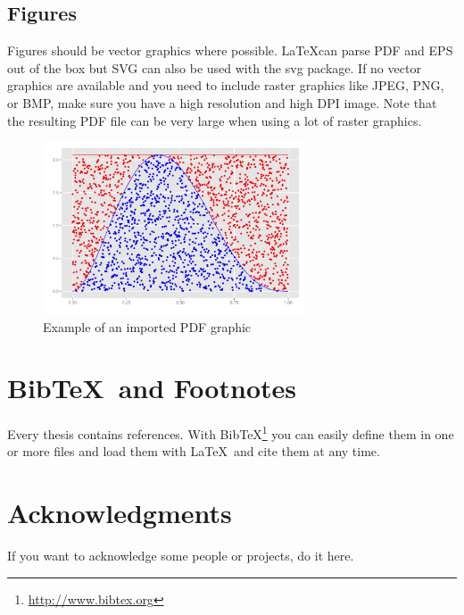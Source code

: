 \documentclass[masterarbeit, grey, english]{mas-thesis-sections}	%
\begin{document}
\subsection{Figures}

Figures should be vector graphics where possible. \LaTeX can parse PDF and EPS out of the box but SVG can also be used with the svg package. If no vector graphics are available and you need to include raster graphics like JPEG, PNG, or BMP, make sure you have a high resolution and high DPI image. Note that the resulting PDF file can be very large when using a lot of raster graphics.

\begin{figure}[ht]
	\centering
	\includegraphics[height=5.1cm]{graphics/demo-graphic.pdf}
	\caption{Example of an imported PDF graphic}
	\label{figure:1}
\end{figure}



\section{Bib\TeX\ and Footnotes}

Every thesis contains references. With Bib\TeX\footnote{\url{http://www.bibtex.org}} you can easily define them in one or more files and load them with \LaTeX\ and cite them at any time.\cite{exampleBook}



\section*{Acknowledgments}

If you want to acknowledge some people or projects, do it here.



\printbibliography[heading=bibintoc]
\end{document}
